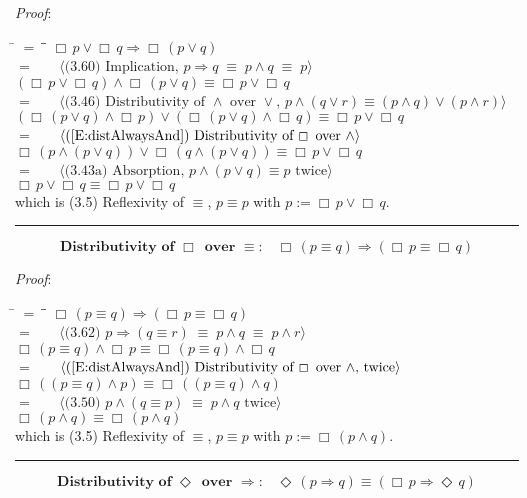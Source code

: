 \documentclass[12pt, fleqn, leqno]{article}
\newcommand{\lgap}{2pt}                             %
\newcommand{\mymathindent}{24pt}                    %
\newcommand{\equivs}{\ensuremath{\;\equiv\;}}       %
\newcommand{\impl}{\ensuremath{\Rightarrow}}        %
\newcommand{\Event}{\Diamond\,}
\newcommand{\Always}{\Box\,}
\newcommand{\myqed}{\rule[-.23ex]{1.2ex}{2.0ex}}
\newcommand{\myqedtab}{\hspace{384pt}}              %
\newcommand{\Gll} {\langle}                         %
\newcommand{\Ggg} {\rangle}                         %
\newcommand{\Hint}[1]     {\ \ \ $\Gll              \mbox{#1} \Ggg$ }   %
\begin{document}
\emph{Proof}:
\begin{tabbing}
\hspace{\mymathindent} \= $= \;$ \= \myqedtab \= \kill
  \> \>   $\Always p \lor \Always q \impl \Always(p \lor q)$\\[\lgap]
  \> $=$  \>  \Hint{(3.60) Implication, $p\impl q \equivs p\land q \equivs p$}\\[\lgap]
  \> \>   $(\Always p \lor \Always q) \land \Always(p \lor q) \equiv \Always p \lor \Always q$\\[\lgap]
  \> $=$  \>  \Hint{(3.46) Distributivity of $\land$ over $\lor$, $p\land (q\lor r)\equiv (p\land q)\lor (p\land r)$}\\[\lgap]
  \> \>   $(\Always (p \lor q) \land \Always p) \lor (\Always (p \lor q) \land \Always q) \equiv \Always p \lor \Always q$\\[\lgap]
  \> $=$  \>  \Hint{(\ref{E:distAlwaysAnd}) Distributivity of $\Always$ over $\land$}\\[\lgap]
  \> \>   $\Always(p \land (p \lor q)) \lor \Always(q \land (p \lor q)) \equiv \Always p \lor \Always q$\\[\lgap]
  \> $=$  \>  \Hint{(3.43a) Absorption, $p \land (p \lor q) \equiv p$ twice}\\[\lgap]
  \> \>   $\Always p \lor \Always q \equiv \Always p \lor \Always q$\\[\lgap]
  \> which is (3.5) Reflexivity of $\equiv$, $p\equiv p$ with $p:=\Always p \lor \Always q$. \quad \myqed
\end{tabbing}
\begin{equation}\label{E:distAlwaysEquiv}
\textbf{Distributivity of $\Always$ over $\equiv$:}\quad \Always (p \equiv q) \impl (\Always p \equiv \Always q)
\end{equation}

\emph{Proof}:
\begin{tabbing}
\hspace{\mymathindent} \= $= \;$ \= \myqedtab \= \kill
  \> \>   $\Always (p \equiv q) \impl (\Always p \equiv \Always q)$\\[\lgap]
  \> $=$  \>  \Hint{(3.62) $p\impl (q\equiv r) \equivs p\land q\equivs p\land r$}\\[\lgap]
  \> \>   $\Always (p \equiv q) \land \Always p \equiv \Always (p \equiv q) \land \Always q$\\[\lgap]
  \> $=$  \>  \Hint{(\ref{E:distAlwaysAnd}) Distributivity of $\Always$ over $\land$, twice}\\[\lgap]
  \> \>   $\Always((p \equiv q) \land p) \equiv \Always((p \equiv q) \land q)$\\[\lgap]
  \> $=$  \>  \Hint{(3.50) $p\land (q\equiv p)\equivs p\land q$ twice}\\[\lgap]
  \> \>   $\Always(p \land q) \equiv \Always (p \land q)$\\[\lgap]
  \> which is (3.5) Reflexivity of $\equiv$, $p\equiv p$ with $p:=\Always(p \land q)$. \quad \myqed
\end{tabbing}
\begin{equation}\label{E:eventImpAlways}
\textbf{Distributivity of $\Event$ over $\impl$:}\quad \Event (p \impl q) \equiv (\Always p \impl \Event q)
\end{equation}
\end{document}
